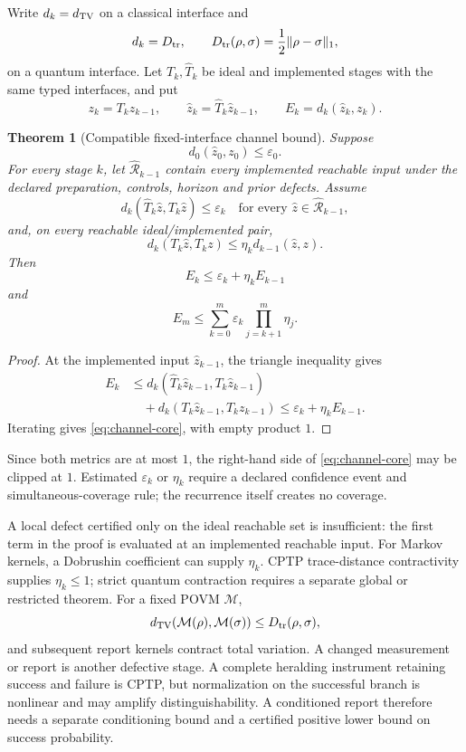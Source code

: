 \documentclass[11pt,a4paper]{article}
\theoremstyle{definition}
\theoremstyle{plain}
\newtheorem{theorem}[definition]{Theorem}
\theoremstyle{remark}
\begin{document}
Write \(d_k=d_{\rm TV}\) on a classical interface and
\[
d_k=D_{\rm tr},\qquad
D_{\rm tr}(\rho,\sigma)=\frac12\lVert\rho-\sigma\rVert_1,
\]
on a quantum interface.  Let \(T_k,\widehat T_k\) be ideal and implemented
stages with the same typed interfaces, and put
\[
z_k=T_kz_{k-1},\qquad
\widehat z_k=\widehat T_k\widehat z_{k-1},\qquad
E_k=d_k(\widehat z_k,z_k).
\]

\begin{theorem}[Compatible fixed-interface channel bound]
\label{thm:channel-core}
Suppose
\[
d_0(\widehat z_0,z_0)\le\varepsilon_0.
\]
For every stage \(k\), let \(\widehat{\mathcal R}_{k-1}\) contain every
implemented reachable input under the declared preparation, controls,
horizon and prior defects.  Assume
\[
d_k(\widehat T_k\widehat z,T_k\widehat z)\le\varepsilon_k
\quad
\text{for every }\widehat z\in\widehat{\mathcal R}_{k-1},
\]
and, on every reachable ideal/implemented pair,
\[
d_k(T_k\widehat z,T_kz)
\le\eta_kd_{k-1}(\widehat z,z).
\]
Then
\[
E_k\le\varepsilon_k+\eta_kE_{k-1}
\]
and
\begin{equation}\label{eq:channel-core}
\boxed{
E_m\le
\sum_{k=0}^{m}\varepsilon_k
\prod_{j=k+1}^{m}\eta_j
}.
\end{equation}
\end{theorem}
\begin{proof}
At the implemented input \(\widehat z_{k-1}\), the triangle inequality gives
\[
\begin{aligned}
E_k
&\le
d_k(\widehat T_k\widehat z_{k-1},T_k\widehat z_{k-1})\\
&\quad+
d_k(T_k\widehat z_{k-1},T_kz_{k-1})
\le\varepsilon_k+\eta_kE_{k-1}.
\end{aligned}
\]
Iterating gives \eqref{eq:channel-core}, with empty product \(1\).
\end{proof}

Since both metrics are at most \(1\), the right-hand side of
\eqref{eq:channel-core} may be clipped at \(1\).  Estimated
\(\varepsilon_k\) or \(\eta_k\) require a declared confidence event and
simultaneous-coverage rule; the recurrence itself creates no coverage.

A local defect certified only on the ideal reachable set is insufficient:
the first term in the proof is evaluated at an implemented reachable input.
For Markov kernels, a Dobrushin coefficient can supply \(\eta_k\).  CPTP
trace-distance contractivity supplies \(\eta_k\le1\); strict quantum
contraction requires a separate global or restricted theorem.  For a fixed
POVM \(\mathcal M\),
\[
d_{\rm TV}(\mathcal M(\rho),\mathcal M(\sigma))
\le D_{\rm tr}(\rho,\sigma),
\]
and subsequent report kernels contract total variation.  A changed
measurement or report is another defective stage.  A complete heralding
instrument retaining success and failure is CPTP, but normalization on the
successful branch is nonlinear and may amplify distinguishability.  A
conditioned report therefore needs a separate conditioning bound and a
certified positive lower bound on success probability.
\end{document}
